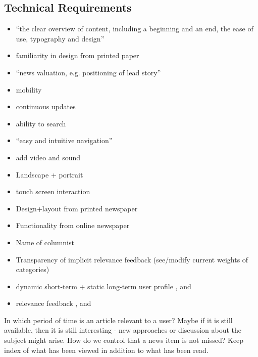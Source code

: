 \subsection{Technical Requirements}
\begin{itemize}
	\item ``the clear overview of content, including a beginning and an end, the ease of use, typography and design'' \cite[p. 7]{FULLTEXT01.pdf}
	\item familiarity in design from printed paper \cite[p. 7]{FULLTEXT01.pdf}
	\item  ``news valuation, e.g. positioning of lead story'' \cite[p. 7]{FULLTEXT01.pdf}
	\item  mobility \cite[p. 7]{FULLTEXT01.pdf}
	\item  continuous updates \cite[p. 7]{FULLTEXT01.pdf}
	\item  ability to search \cite[p. 7]{FULLTEXT01.pdf}
	\item  ``easy and intuitive navigation'' \cite[p. 7]{FULLTEXT01.pdf}
	\item add video and sound \cite[p. 7]{FULLTEXT01.pdf}
	\item Landscape + portrait \cite[p. 6-7]{kristin_fredrik.pdf}
	\item touch screen interaction \cite[p. 6-7]{kristin_fredrik.pdf}
	\item Design+layout from printed newspaper \cite{hcii2005_1004.pdf}
	\item Functionality from online newspaper \cite{hcii2005_1004.pdf}
	\item Name of columnist \cite[p. 4]{gervasum2001ws.pdf}
	\item Transparency of implicit relevance feedback (see/modify current weights of categories) \cite[p. 7]{gervasum2001ws.pdf}
	\item dynamic short-term + static long-term user profile \cite{10-1-1-19-5583}, \cite{fulltext.pdf} and \cite{gervasum2001ws.pdf}
	\item relevance feedback \cite{10-1-1-19-5583}, \cite{fulltext.pdf} and \cite{gervasum2001ws.pdf}
\end{itemize}

In which period of time is an article relevant to a user? Maybe if it is still available, then it is still interesting - new approaches or discussion about the subject might arise. How do we control that a news item is not missed? Keep index of what has been viewed in addition to what has been read.


